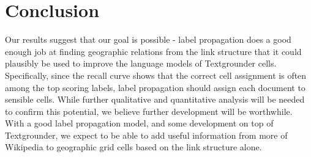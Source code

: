\section{Conclusion}

Our results suggest that our goal is possible - label propagation does a good
enough job at finding geographic relations from the link structure that it
could plausibly be used to improve the language models of Textgrounder cells.
Specifically, since the recall curve shows that the correct cell assignment is
often among the top scoring labels, label propagation should assign each
document to sensible cells. While further qualitative and quantitative
analysis  will be needed to confirm this potential, we believe further
development  will be worthwhile. With a good label propagation model, and some
development on top of Textgrounder, we expect to be able to add useful
information from more of Wikipedia to geographic grid cells based on the link structure
alone.
